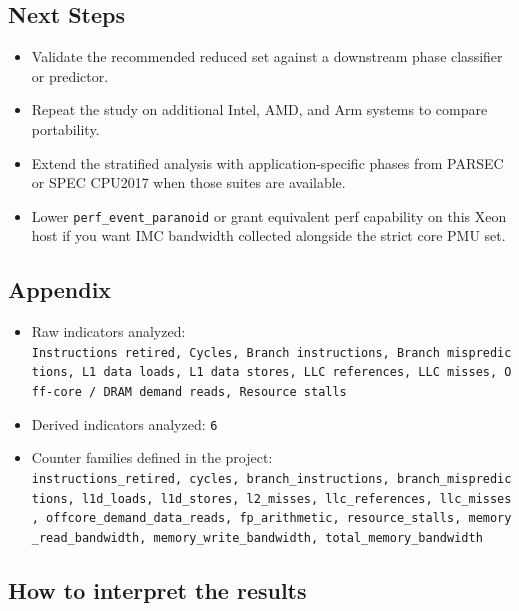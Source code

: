 \documentclass[
]{article}
\providecommand{\tightlist}{%
  \setlength{\itemsep}{0pt}\setlength{\parskip}{0pt}}
\begin{document}
\hypertarget{next-steps}{%
\subsection{Next Steps}\label{next-steps}}

\begin{itemize}
\tightlist
\item
  Validate the recommended reduced set against a downstream phase
  classifier or predictor.
\item
  Repeat the study on additional Intel, AMD, and Arm systems to compare
  portability.
\item
  Extend the stratified analysis with application-specific phases from
  PARSEC or SPEC CPU2017 when those suites are available.
\item
  Lower \texttt{perf\_event\_paranoid} or grant equivalent perf
  capability on this Xeon host if you want IMC bandwidth collected
  alongside the strict core PMU set.
\end{itemize}

\hypertarget{appendix}{%
\subsection{Appendix}\label{appendix}}

\begin{itemize}
\tightlist
\item
  Raw indicators analyzed:
  \texttt{Instructions\ retired,\ Cycles,\ Branch\ instructions,\ Branch\ mispredictions,\ L1\ data\ loads,\ L1\ data\ stores,\ LLC\ references,\ LLC\ misses,\ Off-core\ /\ DRAM\ demand\ reads,\ Resource\ stalls}
\item
  Derived indicators analyzed: \texttt{6}
\item
  Counter families defined in the project:
  \texttt{instructions\_retired,\ cycles,\ branch\_instructions,\ branch\_mispredictions,\ l1d\_loads,\ l1d\_stores,\ l2\_misses,\ llc\_references,\ llc\_misses,\ offcore\_demand\_data\_reads,\ fp\_arithmetic,\ resource\_stalls,\ memory\_read\_bandwidth,\ memory\_write\_bandwidth,\ total\_memory\_bandwidth}
\end{itemize}

\hypertarget{how-to-interpret-the-results}{%
\subsection{How to interpret the
results}\label{how-to-interpret-the-results}}
\end{document}
